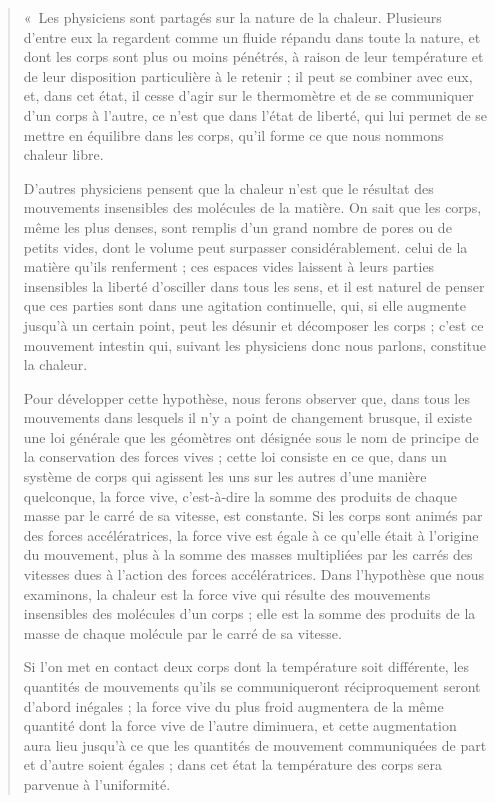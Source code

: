 	\begin{quote} «~Les physiciens sont partagés sur la nature de la chaleur. Plusieurs d’entre eux la regardent comme un fluide répandu dans toute la nature, et dont les corps sont plus ou moins pénétrés, à raison de leur température et de leur disposition particulière à le retenir ; il peut se combiner avec eux, et, dans cet état, il cesse d’agir sur le thermomètre et de se communiquer d’un corps à l’autre, ce n’est que dans l’état de liberté, qui lui permet de se mettre en équilibre dans les corps, qu’il forme ce que nous nommons chaleur libre. 

	D’autres physiciens pensent que la chaleur n’est que le résultat des mouvements insensibles des molécules de la matière. On sait que les corps, même les plus denses, sont remplis d’un grand nombre de pores ou de petits vides, dont le volume peut surpasser considérablement. celui de la matière qu’ils renferment ; ces espaces vides laissent à leurs parties insensibles la liberté d’osciller dans tous les sens, et il est naturel de penser que ces parties sont dans une agitation continuelle, qui, si elle augmente jusqu’à un certain point, peut les désunir et décomposer les corps ; c’est ce mouvement intestin qui, suivant les physiciens donc nous parlons, constitue la chaleur. 

	Pour développer cette hypothèse, nous ferons observer que, dans tous les mouvements dans lesquels il n’y a point de changement brusque, il existe une loi générale que les géomètres ont désignée sous le nom de principe de la conservation des forces vives ; cette loi consiste en ce que, dans un système de corps qui agissent les uns sur les autres d’une manière quelconque, la force vive, c’est-à-dire la somme des produits de chaque masse par le carré de sa vitesse, est constante. Si les corps sont animés par des forces accélératrices, la force vive est égale à ce qu’elle était à l’origine du mouvement, plus à la somme des masses multipliées par les carrés des vitesses dues à l’action des forces accélératrices. Dans l’hypothèse que nous examinons, la chaleur est la force vive qui résulte des mouvements insensibles des molécules d’un corps ; elle est la somme des produits de la masse de chaque molécule par le carré de sa vitesse. 

	Si l’on met en contact deux corps dont la température soit différente, les quantités de mouvements qu’ils se communiqueront réciproquement seront d’abord inégales ; la force vive du plus froid augmentera de la même quantité dont la force vive de l’autre diminuera, et cette augmentation aura lieu jusqu’à ce que les quantités de mouvement communiquées de part et d’autre soient égales ; dans cet état la température des corps sera parvenue à l’uniformité. 


\end{quote}
